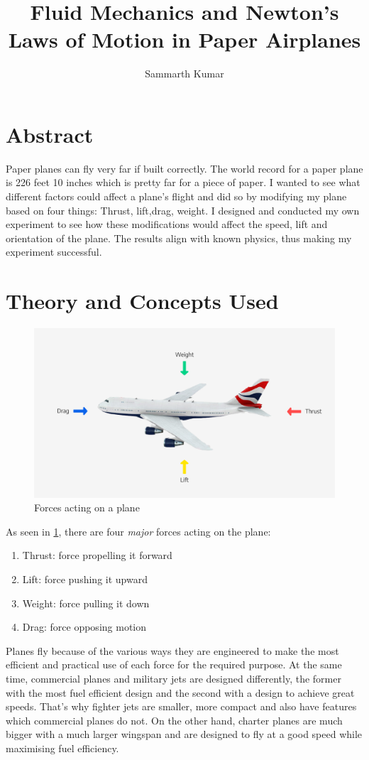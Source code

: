 \documentclass[12pt]{article}
\author{Sammarth Kumar}
\title{Fluid Mechanics and Newton's Laws of Motion in Paper Airplanes}
\begin{document}
\maketitle
\tableofcontents
\newpage
\section{Abstract}
Paper planes can fly very far if built correctly. The world record for a paper plane is 226 feet 10 inches which is pretty far for a piece of paper. I wanted to see what different factors could affect a plane's flight and did so by modifying my plane based on four things: Thrust, lift,drag, weight. I designed and conducted my own experiment to see how these modifications would affect the speed, lift and orientation of the plane. The results align with known physics, thus making my experiment successful.
\section{Theory and Concepts Used}
\begin{figure}[h!]
\begin{center}
\includegraphics[scale=0.15]{plane1}
\end{center}
\caption{Forces acting on a plane}
\label{fig:Plane Diagram}
\end{figure}
As seen in \ref{fig:Plane Diagram}, there are four \emph{major} forces acting on the plane:
\begin{enumerate}
\item Thrust: force propelling it forward
\item Lift: force pushing it upward
\item Weight: force pulling it down
\item Drag: force opposing motion
\end{enumerate}
Planes fly because of the various ways they are engineered to make the most efficient and practical use of each force for the required purpose.
At the same time, commercial planes and military jets are designed differently, the former with the most fuel efficient design and the second with a design to achieve great speeds. That's why fighter jets are smaller, more compact and also have features which commercial planes do not. On the other hand, charter planes are much bigger with a much larger wingspan and are designed to fly at a good speed while maximising fuel efficiency.
\end{document}
